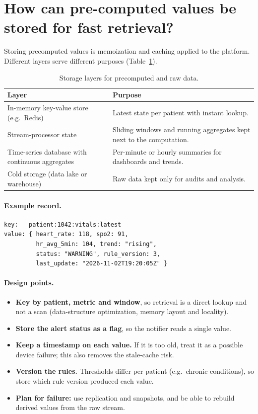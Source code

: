\documentclass[11pt,a4paper]{article}
\begin{document}
\section{How can pre-computed values be stored for fast retrieval?}

Storing precomputed values is memoization and caching applied to the platform. Different layers serve different purposes (Table~\ref{tab:storage}).

\begin{table}[H]
\centering
\caption{Storage layers for precomputed and raw data.}\label{tab:storage}
\begin{tabular}{@{}>{\raggedright\arraybackslash}p{6.2cm}>{\raggedright\arraybackslash}p{8.6cm}@{}}
\toprule
\textbf{Layer} & \textbf{Purpose}\\
\midrule
In-memory key-value store (e.g.\ Redis) & Latest state per patient with instant lookup.\\
Stream-processor state & Sliding windows and running aggregates kept next to the computation.\\
Time-series database with continuous aggregates & Per-minute or hourly summaries for dashboards and trends.\\
Cold storage (data lake or warehouse) & Raw data kept only for audits and analysis.\\
\bottomrule
\end{tabular}
\end{table}

\paragraph{Example record.}
\begin{lstlisting}[language={},numbers=none]
key:   patient:1042:vitals:latest
value: { heart_rate: 118, spo2: 91,
         hr_avg_5min: 104, trend: "rising",
         status: "WARNING", rule_version: 3,
         last_update: "2026-11-02T19:20:05Z" }
\end{lstlisting}

\paragraph{Design points.}
\begin{itemize}
  \item \textbf{Key by patient, metric and window}, so retrieval is a direct lookup and not a scan (data-structure optimization, memory layout and locality).
  \item \textbf{Store the alert status as a flag}, so the notifier reads a single value.
  \item \textbf{Keep a timestamp on each value.} If it is too old, treat it as a possible device failure; this also removes the stale-cache risk.
  \item \textbf{Version the rules.} Thresholds differ per patient (e.g.\ chronic conditions), so store which rule version produced each value.
  \item \textbf{Plan for failure:} use replication and snapshots, and be able to rebuild derived values from the raw stream.
\end{itemize}
\end{document}
